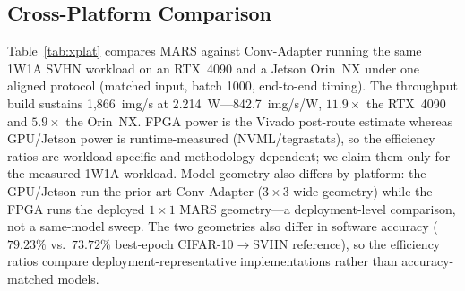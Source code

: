\documentclass[journal]{IEEEtran}
\begin{document}
\begin{table}[!t]
\centering
\caption{Claim--evidence summary.}
\label{tab:evidence}
\footnotesize
\renewcommand{\arraystretch}{1.1}
\end{table}

\subsection{Cross-Platform Comparison}
Table~\ref{tab:xplat} compares MARS against Conv-Adapter running the same 1W1A SVHN workload on an RTX~4090 and a Jetson Orin~NX under one aligned protocol (matched input, batch 1000, end-to-end timing). The throughput build sustains 1{,}866~img/s at 2.214~W---842.7~img/s/W, $11.9\times$ the RTX~4090 and $5.9\times$ the Orin~NX. FPGA power is the Vivado post-route estimate whereas GPU/Jetson power is runtime-measured (NVML/tegrastats), so the efficiency ratios are workload-specific and methodology-dependent; we claim them only for the measured 1W1A workload. Model geometry also differs by platform: the GPU/Jetson run the prior-art Conv-Adapter ($3{\times}3$ wide geometry) while the FPGA runs the deployed $1{\times}1$ MARS geometry---a deployment-level comparison, not a same-model sweep. The two geometries also differ in software accuracy ($79.23\%$ vs.\ $73.72\%$ best-epoch CIFAR-10$\to$SVHN reference), so the efficiency ratios compare deployment-representative implementations rather than accuracy-matched models.
\end{document}
